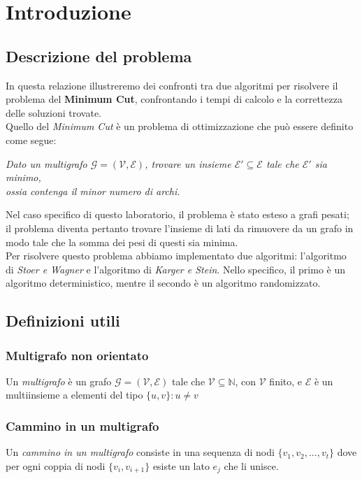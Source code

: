 \section{Introduzione}

\subsection{Descrizione del problema}
In questa relazione illustreremo dei confronti tra due algoritmi per risolvere il problema del \textbf{Minimum Cut}, confrontando i tempi di calcolo e la correttezza delle soluzioni trovate. \\
Quello del \textit{Minimum Cut} è un problema di ottimizzazione che può essere definito come segue:
\begin{center}
    \centering
    \textit{
        Dato un multigrafo $\mathcal{G}=(\mathcal{V}, \mathcal{E})$, trovare un insieme $\mathcal{E}{}'\subseteq \mathcal{E}$ tale che $\mathcal{E}{}'$ sia minimo,\\ ossia contenga il minor numero di archi.
    }
\end{center}
Nel caso specifico di questo laboratorio, il problema è stato esteso a grafi pesati; il problema diventa pertanto trovare l'insieme di lati da rimuovere da un grafo in modo tale che la somma dei pesi di questi sia minima. \\
Per risolvere questo problema abbiamo implementato due algoritmi: l'algoritmo di \textit{Stoer e Wagner} e l'algoritmo di \textit{Karger e Stein}. Nello specifico, il primo è un algoritmo deterministico, mentre il secondo è un algoritmo randomizzato.

\subsection{Definizioni utili}

\subsubsection*{Multigrafo non orientato}
Un \textit{multigrafo} è un grafo $\mathcal{G}=(\mathcal{V}, \mathcal{E})$ tale che $\mathcal{V} \subseteq \mathbb{N}$, con $\mathcal{V}$ finito, e $\mathcal{E}$ è un multiinsieme a elementi del tipo $\{u, v\}: u\neq v$

\subsubsection*{Cammino in un multigrafo}
Un \textit{cammino in un multigrafo} consiste in una sequenza di nodi $\{v_1, v_2, ..., v_t\}$ dove per ogni coppia di nodi $\{v_i, v_{i+1}\}$ esiste un lato $e_j$ che li unisce.

